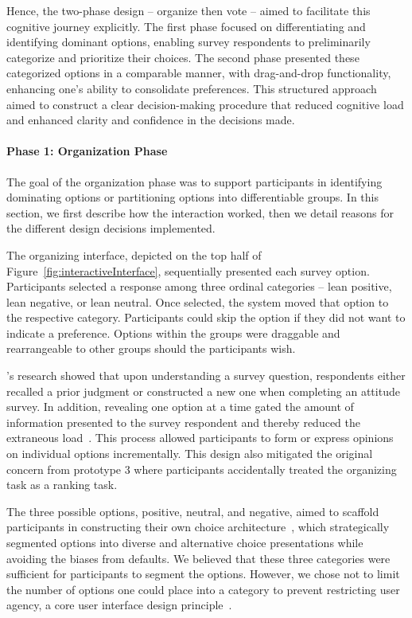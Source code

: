 Hence, the two-phase design -- organize then vote -- aimed to facilitate this cognitive journey explicitly. The first phase focused on differentiating and identifying dominant options, enabling survey respondents to preliminarily categorize and prioritize their choices. The second phase presented these categorized options in a comparable manner, with drag-and-drop functionality, enhancing one's ability to consolidate preferences. This structured approach aimed to construct a clear decision-making procedure that reduced cognitive load and enhanced clarity and confidence in the decisions made.

\paragraph{Phase 1: Organization Phase}
The goal of the organization phase was to support participants in identifying dominating options or partitioning options into differentiable groups. In this section, we first describe how the interaction worked, then we detail reasons for the different design decisions implemented.

The organizing interface, depicted on the top half of Figure~\ref{fig:interactiveInterface}, sequentially presented each survey option. Participants selected a response among three ordinal categories -- lean positive, lean negative, or lean neutral. Once selected, the system moved that option to the respective category. Participants could skip the option if they did not want to indicate a preference. Options within the groups were draggable and rearrangeable to other groups should the participants wish.

\textcite{strackThinkingJudgingCommunicating1987}'s research showed that upon understanding a survey question, respondents either recalled a prior judgment or constructed a new one when completing an attitude survey. In addition, revealing one option at a time gated the amount of information presented to the survey respondent and thereby reduced the extraneous load~\cite{swellerCognitiveLoadTheory2011}. This process allowed participants to form or express opinions on individual options incrementally. This design also mitigated the original concern from prototype 3 where participants accidentally treated the organizing task as a ranking task.

The three possible options, positive, neutral, and negative, aimed to scaffold participants in constructing their own choice architecture~\cite{munscherReviewTaxonomyChoice2016, thalerNudgeImprovingDecisions2008a}, which strategically segmented options into diverse and alternative choice presentations while avoiding the biases from defaults. We believed that these three categories were sufficient for participants to segment the options. However, we chose not to limit the number of options one could place into a category to prevent restricting user agency, a core user interface design principle~\cite{norman2013design}.

